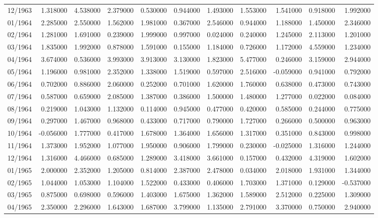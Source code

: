 \begin{tabular}{lrrrrrrrrrr}
12/1963 & 1.318000 & 4.538000 & 2.379000 & 0.530000 & 0.944000 & 1.493000 & 1.553000 & 1.541000 & 0.918000 & 1.992000 \\
01/1964 & 2.285000 & 2.550000 & 1.562000 & 1.981000 & 0.367000 & 2.546000 & 0.944000 & 1.188000 & 1.450000 & 2.346000 \\
02/1964 & 1.281000 & 1.691000 & 0.239000 & 1.999000 & 0.997000 & 0.024000 & 0.240000 & 1.245000 & 2.113000 & 1.201000 \\
03/1964 & 1.835000 & 1.992000 & 0.878000 & 1.591000 & 0.155000 & 1.184000 & 0.726000 & 1.172000 & 4.559000 & 1.234000 \\
04/1964 & 3.674000 & 0.536000 & 3.993000 & 3.913000 & 3.130000 & 1.823000 & 5.477000 & 0.246000 & 3.159000 & 2.944000 \\
05/1964 & 1.196000 & 0.981000 & 2.352000 & 1.338000 & 1.519000 & 0.597000 & 2.516000 & -0.059000 & 0.941000 & 0.792000 \\
06/1964 & 0.702000 & 0.886000 & 2.060000 & 0.252000 & 0.701000 & 1.620000 & 1.760000 & 0.638000 & 0.473000 & 0.743000 \\
07/1964 & 0.587000 & 0.659000 & 2.085000 & 1.387000 & 0.386000 & 1.500000 & 1.480000 & 1.277000 & 0.022000 & 0.084000 \\
08/1964 & 0.219000 & 1.043000 & 1.132000 & 0.114000 & 0.945000 & 0.477000 & 0.420000 & 0.585000 & 0.244000 & 0.775000 \\
09/1964 & 0.297000 & 1.467000 & 0.968000 & 0.433000 & 0.717000 & 0.790000 & 1.727000 & 0.266000 & 0.500000 & 0.963000 \\
10/1964 & -0.056000 & 1.777000 & 0.417000 & 1.678000 & 1.364000 & 1.656000 & 1.317000 & 0.351000 & 0.843000 & 0.998000 \\
11/1964 & 1.373000 & 1.952000 & 1.077000 & 1.950000 & 0.906000 & 1.799000 & 0.230000 & -0.025000 & 1.316000 & 1.244000 \\
12/1964 & 1.316000 & 4.466000 & 0.685000 & 1.289000 & 3.418000 & 3.661000 & 0.157000 & 0.432000 & 4.319000 & 1.602000 \\
01/1965 & 2.000000 & 2.352000 & 1.205000 & 0.814000 & 2.387000 & 2.478000 & 0.034000 & 2.018000 & 1.931000 & 1.344000 \\
02/1965 & 1.044000 & 1.053000 & 1.104000 & 1.522000 & 0.433000 & 0.406000 & 1.703000 & 1.371000 & 0.129000 & -0.537000 \\
03/1965 & 0.875000 & 0.698000 & 0.596000 & 1.403000 & 1.675000 & 1.362000 & 1.589000 & 2.512000 & 0.225000 & 1.309000 \\
04/1965 & 2.350000 & 2.296000 & 1.643000 & 1.687000 & 3.799000 & 1.135000 & 2.791000 & 3.370000 & 0.750000 & 2.940000 \\

\end{tabular}
